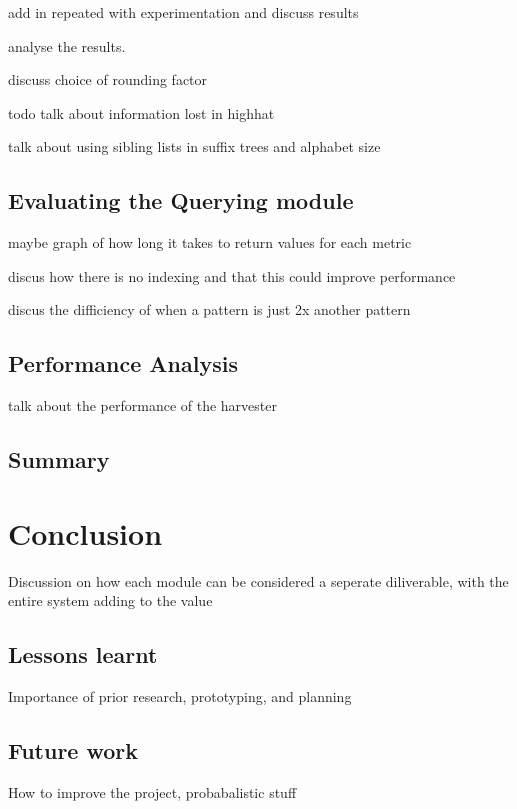 \documentclass[12pt,twoside,notitlepage]{report}
\begin{document}
		
		
		add in repeated with experimentation and discuss results				
		
		analyse the results.
		
		discuss choice of rounding factor
				
		todo talk about information lost in highhat

		talk about using sibling lists in suffix trees and alphabet size
	\section{Evaluating the Querying module}
		maybe graph of how long it takes to return values for each metric
		
		discus how there is no indexing and that this could improve performance
		
		discus the difficiency of when a pattern is just 2x another pattern
	
	\section{Performance Analysis}
	talk about the performance of the harvester
	
	
	\section{Summary}
	
\cleardoublepage
\chapter{Conclusion}
	Discussion on how each module can be considered a seperate diliverable, with the entire system adding to the value
	\section{Lessons learnt}
	Importance of prior research, prototyping, and planning
	
	\section{Future work}
	How to improve the project, probabalistic stuff
	

\cleardoublepage

\end{document}
